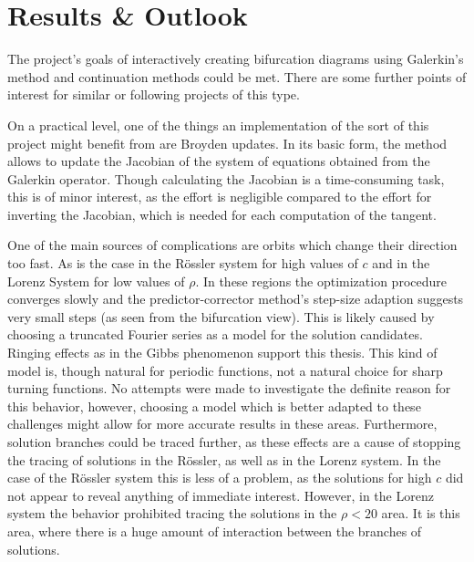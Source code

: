 \section{Results \& Outlook}
\label{sec:outro}

The project's goals of interactively creating bifurcation diagrams using Galerkin's method and continuation methods could be met.
There are some further points of interest for similar or following projects of this type.

On a practical level, one of the things an implementation of the sort of this project might benefit from are Broyden updates.
In its basic form, the method allows to update the Jacobian of the system of equations obtained from the Galerkin operator.
Though calculating the Jacobian is a time-consuming task, this is of minor interest, as the effort is negligible compared to the effort for inverting the Jacobian, which is needed for each computation of the tangent.

One of the main sources of complications are orbits which change their direction too fast.
As is the case in the Rössler system for high values of $c$ and in the Lorenz System for low values of $\rho$. %
In these regions the optimization procedure converges slowly and the predictor-corrector method's step-size adaption suggests very small steps (as seen from the bifurcation view).
This is likely caused by choosing a truncated Fourier series as a model for the solution candidates.
Ringing effects as in the Gibbs phenomenon support this thesis.
This kind of model is, though natural for periodic functions, not a natural choice for sharp turning functions.
No attempts were made to investigate the definite reason for this behavior, however, choosing a model which is better adapted to these challenges might allow for more accurate results in these areas.
Furthermore, solution branches could be traced further, as these effects are a cause of stopping the tracing of solutions in the Rössler, as well as in the Lorenz system. %
In the case of the Rössler system this is less of a problem, as the solutions for high $c$ did not appear to reveal anything of immediate interest.
However, in the Lorenz system the behavior prohibited tracing the solutions in the $\rho < 20$ area.
It is this area, where there is a huge amount of interaction between the branches of solutions.

